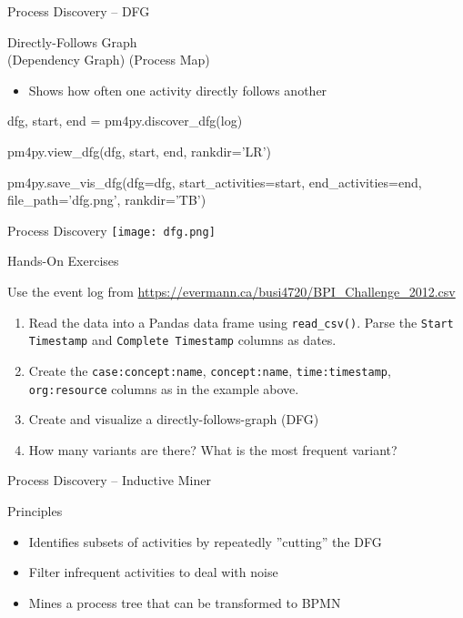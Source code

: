 \documentclass[ignorenonframetext,xcolor=x11names]{beamer}
\begin{document}
\begin{frame}[fragile]{Process Discovery -- DFG}
\begin{block}{Directly-Follows Graph \\ (Dependency Graph) (Process Map)}
\begin{itemize}
   \item Shows how often one activity directly follows another
\end{itemize}
\end{block}
\footnotesize
\begin{pythoncode}
dfg, start, end = pm4py.discover_dfg(log)

pm4py.view_dfg(dfg, start, end, rankdir='LR')

pm4py.save_vis_dfg(dfg=dfg,
    start_activities=start, 
    end_activities=end, 
    file_path='dfg.png', rankdir='TB')
\end{pythoncode}
\end{frame}

\begin{frame}{Process Discovery}
\centering
\texttt{[image: dfg.png]}
\end{frame}

\begin{frame}{Hands-On Exercises}

\footnotesize
Use the event log from \url{https://evermann.ca/busi4720/BPI_Challenge_2012.csv}
\begin{enumerate}
   \item Read the data into a Pandas data frame using \texttt{read\_csv()}. Parse the \texttt{Start Timestamp} and \texttt{Complete Timestamp} columns as dates.
   \item Create the \texttt{case:concept:name}, \texttt{concept:name}, \texttt{time:timestamp}, \texttt{org:resource} columns as in the example above.
   \item Create and visualize a directly-follows-graph (DFG)
   \item How many variants are there? What is the most frequent variant?
\end{enumerate}
\end{frame}


\begin{frame}{Process Discovery -- Inductive Miner}
\begin{block}{Principles}
\begin{itemize}
   \item Identifies subsets of activities by repeatedly ''cutting'' the DFG
   \item Filter infrequent activities to deal with noise
   \item Mines a process tree that can be transformed to BPMN
\end{itemize}
\end{block}
\end{frame}
\end{document}
